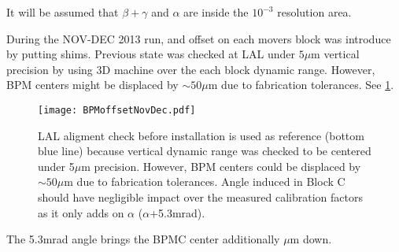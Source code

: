 It will be assumed that $\beta+\gamma$ and $\alpha$ are inside the $10^{-3}$ resolution area.\par
During the NOV-DEC 2013 run, and offset on each movers block was introduce by putting shims. Previous state was checked at LAL under $5\mu$m vertical precision by using 3D machine over the each block dynamic range. However, BPM centers might be displaced by $\sim50\mu$m due to fabrication tolerances. See \ref{f-BPMoffsetNovDec}.\par
\begin{figure}[htb]
 \begin{center}
  \texttt{[image: BPMoffsetNovDec.pdf]}\caption{LAL aligment check before installation is used as reference (bottom blue line) because vertical dynamic range was checked to be centered under 5$\mu$m precision. However, BPM centers could be displaced by $\sim 50\mu$m due to fabrication tolerances. Angle induced in Block C should have negligible impact over the measured calibration factors as it only adds on $\alpha$ ($\alpha$+5.3mrad).}\label{f-BPMoffsetNovDec}
 \end{center}
\end{figure}
The 5.3mrad angle brings the BPMC center additionally $\mu$m down.\par

